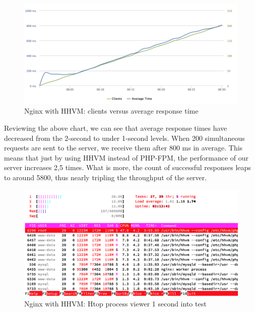 \begin{figure}[H]
\begin{center}
\includegraphics[scale=0.5]{figures/Nginx_HHVM.png}
\caption{Nginx with HHVM: clients versus average response time}
\label{fig:nginx_hhvm}
\end{center}
\end{figure}

Reviewing the above chart, we can see that average response times have decreased from the 2-second to under 1-second levels. When 200 simultaneous requests are sent to the server, we receive them after 800 ms in average. This means that just by using HHVM instead of PHP-FPM, the performance of our server increases 2,5 times. What is more, the count of successful responses leaps to around 5800, thus nearly tripling the throughput of the server. \cite{Loader.io:nginx_hhvm}

\begin{figure}[H]
\begin{center}
\includegraphics[scale=0.5]{figures/Nginx_HHVM_1s.png}
\caption{Nginx with HHVM: Htop process viewer 1 second into test}
\label{fig:nginx_hhvm_1s}
\end{center}
\end{figure}

